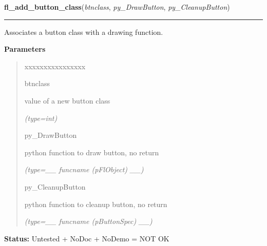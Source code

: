 \hspace{.8\funcindent}\begin{boxedminipage}{\funcwidth}

    \raggedright \textbf{fl\_add\_button\_class}(\textit{btnclass}, \textit{py\_DrawButton}, \textit{py\_CleanupButton})

    \vspace{-1.5ex}

    \rule{\textwidth}{0.5\fboxrule}
\setlength{\parskip}{2ex}
    Associates a button class with a drawing function.

\setlength{\parskip}{1ex}
      \textbf{Parameters}
      \vspace{-1ex}

      \begin{quote}
        \begin{Ventry}{xxxxxxxxxxxxxxxx}

          \item[btnclass]

          value of a new button class

            {\it (type=int)}

          \item[py\_DrawButton]

          python function to draw button, no return

            {\it (type=\_\_ funcname (pFlObject) \_\_)}

          \item[py\_CleanupButton]

          python function to cleanup button, no return

            {\it (type=\_\_ funcname (pButtonSpec) \_\_)}

        \end{Ventry}

      \end{quote}

\textbf{Status:} Untested + NoDoc + NoDemo = NOT OK



    \end{boxedminipage}

    \label{xformslib:flbutton:fl_set_button_mouse_buttons}

    \vspace{0.5ex}


